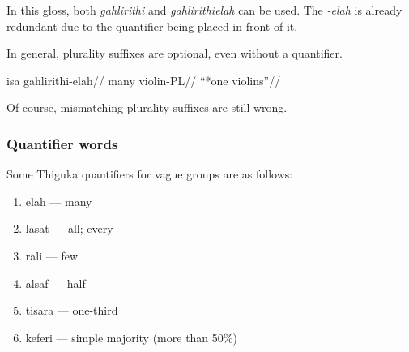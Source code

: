 In this gloss, both \textit{gahlirithi} and \textit{gahlirithielah} can be used.
The \textit{-elah} is already redundant due to the quantifier being placed in front of it.

In general, plurality suffixes are optional, even without a quantifier.

\ex
\begingl
    \gla  isa  gahlirithi-elah//
    \glb  many violin-PL//
    \glft ``*one violins''//
\endgl
\xe

Of course, mismatching plurality suffixes are still wrong.

\subsubsection*{Quantifier words}

Some Thiguka quantifiers for vague groups are as follows:
\begin{enumerate}
    \item elah --- many
    \item lasat --- all; every
    \item rali --- few
    \item alsaf --- half
    \item tisara --- one-third
    \item keferi --- simple majority (more than 50\%{})
          
\end{enumerate}
